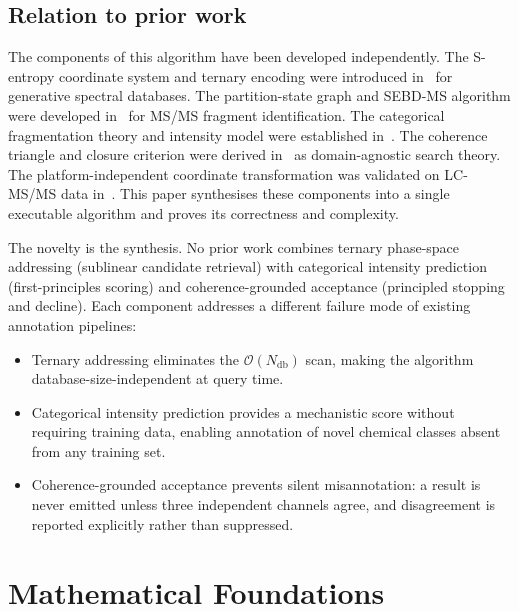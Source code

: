 \documentclass[twocolumn,10pt,a4paper]{article}
\theoremstyle{thmstyle}
\theoremstyle{definition}
\theoremstyle{remark}
\begin{document}
\subsection{Relation to prior work}

The components of this algorithm have been developed independently.
The S-entropy coordinate system and ternary encoding were introduced
in~\citet{sachikonye2024generative} for generative spectral databases.
The partition-state graph and SEBD-MS algorithm were developed
in~\citet{sachikonye2024partition} for MS/MS fragment identification.
The categorical fragmentation theory and intensity model were
established in~\citet{sachikonye2024categorical}. The coherence
triangle and closure criterion were derived
in~\citet{sachikonye2024scp} as domain-agnostic search theory. The
platform-independent coordinate transformation was validated on
LC-MS/MS data in~\citet{sachikonye2024ucdavis}. This paper synthesises
these components into a single executable algorithm and proves its
correctness and complexity.

The novelty is the synthesis. No prior work combines ternary phase-space
addressing (sublinear candidate retrieval) with categorical intensity
prediction (first-principles scoring) and coherence-grounded acceptance
(principled stopping and decline). Each component addresses a different
failure mode of existing annotation pipelines:
\begin{itemize}[nosep]
\item Ternary addressing eliminates the $\mathcal{O}(N_{\mathrm{db}})$
  scan, making the algorithm database-size-independent at query time.
\item Categorical intensity prediction provides a mechanistic score
  without requiring training data, enabling annotation of novel
  chemical classes absent from any training set.
\item Coherence-grounded acceptance prevents silent misannotation: a
  result is never emitted unless three independent channels agree, and
  disagreement is reported explicitly rather than suppressed.
\end{itemize}


\section{Mathematical Foundations}
\label{sec:foundations}
\end{document}
